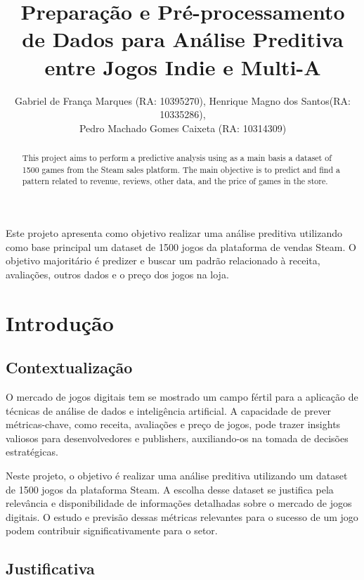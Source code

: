 \documentclass[12pt]{article}
\title{Preparação e Pré-processamento de Dados para Análise Preditiva entre Jogos Indie e Multi-A}
\author{Gabriel de França Marques (RA: 10395270)\inst{1}, Henrique Magno dos Santos(RA: 10335286)\inst{1}, \\ 
Pedro Machado Gomes Caixeta (RA: 10314309)\inst{1}}
\begin{document}
 

\maketitle

\begin{abstract}
  This project aims to perform a predictive analysis using as a main basis a dataset of 
  1500 games from the Steam sales platform. The main objective is to predict and find a 
  pattern related to revenue, reviews, other data, and the price of games in the store.
\end{abstract}
     
\begin{resumo} 
  Este projeto apresenta como objetivo realizar uma análise preditiva utilizando
  como base principal um dataset de 1500 jogos da plataforma de vendas Steam. O
  objetivo majoritário é predizer e buscar um padrão relacionado à receita, avaliações, 
  outros dados e o preço dos jogos na loja.
\end{resumo}


\section{Introdução}
\subsection{Contextualização} \label{sec:contextualizacao}

O mercado de jogos digitais tem se mostrado um campo fértil para a aplicação de técnicas 
de análise de dados e inteligência artificial. A capacidade de prever métricas-chave, 
como receita, avaliações e preço de jogos, pode trazer insights valiosos para 
desenvolvedores e publishers, auxiliando-os na tomada de decisões estratégicas.

Neste projeto, o objetivo é realizar uma análise preditiva utilizando um dataset de 1500 
jogos da plataforma Steam. A escolha desse dataset se justifica pela relevância e 
disponibilidade de informações detalhadas sobre o mercado de jogos digitais. O estudo e 
 previsão dessas métricas relevantes para o sucesso de um jogo podem contribuir 
 significativamente para o setor.

\subsection{Justificativa} \label{sec:firstpage}
\end{document}
